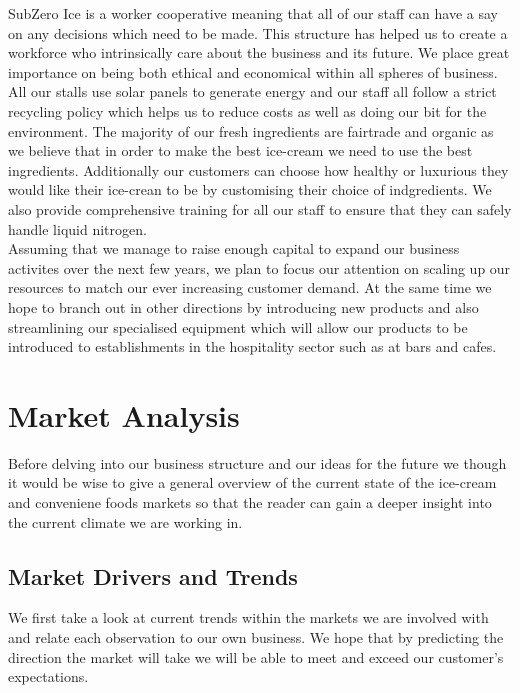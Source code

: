 \documentclass{article}
\begin{document}
SubZero Ice is a worker cooperative meaning that all of our staff can have a say on any decisions which need to be made. This structure has helped us to create a workforce who intrinsically care about the business and its future. We place great importance on being both ethical and economical within all spheres of business. All our stalls use solar panels to generate energy and our staff all follow a strict recycling policy which helps us to reduce costs as well as doing our bit for the environment. The majority of our fresh ingredients are fairtrade and organic as we believe that in order to make the best ice-cream we need to use the best ingredients. Additionally our customers can choose how healthy or luxurious they would like their ice-crean to be by customising their choice of indgredients. We also provide comprehensive training for all our staff to ensure that they can safely handle liquid nitrogen. \\

Assuming that we manage to raise enough capital to expand our business activites over the next few years, we plan to focus our attention on scaling up our resources to match our ever increasing customer demand. At the same time we hope to branch out in other directions by introducing new products and also streamlining our specialised equipment which will allow our products to be introduced to establishments in the hospitality sector such as at bars and cafes.

\section{Market Analysis}
  
  Before delving into our business structure and our ideas for the future we though it would be wise to give a general overview of the current state of the ice-cream and conveniene foods markets so that the reader can gain a deeper insight into the current climate we are working in.

  \subsection{Market Drivers and Trends}

   We first take a look at current trends within the markets we are involved with and relate each observation to our own business. We hope that by predicting the direction the market will take we will be able to meet and exceed our customer's expectations.
   
\end{document}
